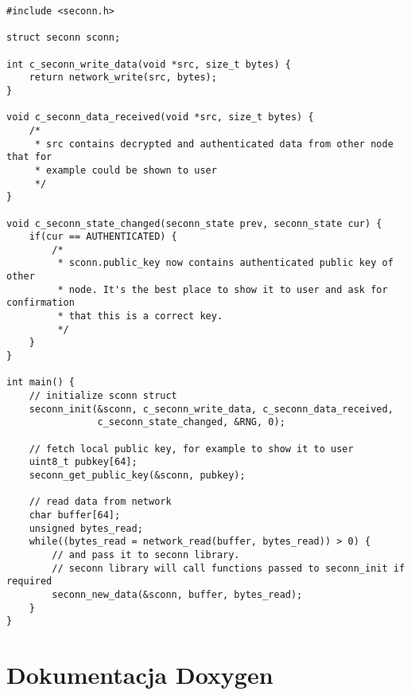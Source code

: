 \label{tab:sample-usage}
\begin{lstlisting}
#include <seconn.h>

struct seconn sconn;

int c_seconn_write_data(void *src, size_t bytes) {
    return network_write(src, bytes);
}

void c_seconn_data_received(void *src, size_t bytes) {
    /*
     * src contains decrypted and authenticated data from other node that for
     * example could be shown to user
     */
}

void c_seconn_state_changed(seconn_state prev, seconn_state cur) {
    if(cur == AUTHENTICATED) {
        /*
         * sconn.public_key now contains authenticated public key of other
         * node. It's the best place to show it to user and ask for confirmation
         * that this is a correct key.
         */
    }
}

int main() {
    // initialize sconn struct
    seconn_init(&sconn, c_seconn_write_data, c_seconn_data_received,
                c_seconn_state_changed, &RNG, 0);

    // fetch local public key, for example to show it to user
    uint8_t pubkey[64];
    seconn_get_public_key(&sconn, pubkey);

    // read data from network
    char buffer[64];
    unsigned bytes_read;
    while((bytes_read = network_read(buffer, bytes_read)) > 0) {
        // and pass it to seconn library.
        // seconn library will call functions passed to seconn_init if required
        seconn_new_data(&sconn, buffer, bytes_read);
    }
}
\end{lstlisting}
\FloatBarrier

\section{Dokumentacja Doxygen}

